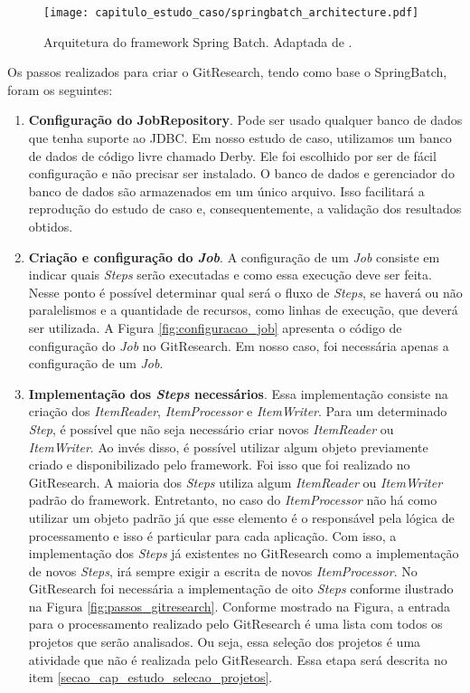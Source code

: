  \begin{figure}[H]
  \centering
  \texttt{[image: capitulo\_estudo\_caso/springbatch\_architecture.pdf]} 
  \caption{Arquitetura do framework Spring Batch. Adaptada de \cite{minella2011pro}.}
  \label{fig:arquitetura_gitresearch} 
\end{figure}

Os passos realizados para criar o GitResearch, tendo como base o SpringBatch, foram os seguintes:


\begin{enumerate}
\item \textbf{Configuração do JobRepository}. Pode ser usado qualquer banco de dados que tenha suporte ao JDBC\cite{reese2000database}. Em nosso estudo de caso, utilizamos um banco de dados de código livre chamado Derby\cite{mei2010research}.  Ele foi escolhido por ser de fácil configuração e não precisar ser instalado. O banco de dados e gerenciador do banco de dados são armazenados em um único arquivo. Isso facilitará a reprodução do estudo de caso e, consequentemente, a validação dos resultados obtidos.
\item \textbf{Criação e configuração do \textit{Job}}. A configuração de um \textit{Job} consiste em indicar quais \textit{Steps} serão executadas e como essa execução deve ser feita. Nesse ponto é possível determinar qual será o fluxo de \textit{Steps}, se haverá ou não paralelismos  e a quantidade de recursos, como linhas de execução, que deverá ser utilizada. A Figura \ref{fig:configuracao_job} apresenta o código de configuração do \textit{Job} no GitResearch. Em nosso caso, foi necessária apenas a configuração de um \textit{Job}.
\item \textbf{Implementação  dos  \textit{Steps} necessários}. Essa implementação consiste na criação dos \textit{ItemReader}, \textit{ItemProcessor} e \textit{ItemWriter}. Para um determinado \textit{Step}, é possível que não seja necessário criar novos \textit{ItemReader} ou \textit{ItemWriter}. Ao invés disso, é possível utilizar algum objeto previamente criado e disponibilizado pelo framework. Foi isso que foi realizado no GitResearch. A maioria dos \textit{Steps} utiliza algum \textit{ItemReader} ou \textit{ItemWriter} padrão do framework. Entretanto, no caso do \textit{ItemProcessor} não há como utilizar um objeto padrão já que esse elemento é o responsável pela lógica de processamento e isso é particular para cada aplicação. Com isso, a implementação dos \textit{Steps} já existentes no GitResearch como a implementação de novos \textit{Steps}, irá sempre exigir a escrita de novos \textit{ItemProcessor}. No GitResearch foi necessária a implementação de oito \textit{Steps} conforme ilustrado na Figura \ref{fig:passos_gitresearch}.  Conforme mostrado na Figura, a entrada para o processamento realizado pelo GitResearch é uma lista com todos os projetos que serão analisados. Ou seja, essa seleção dos projetos é uma atividade que não é realizada pelo GitResearch. Essa etapa será descrita no item \ref{secao_cap_estudo_selecao_projetos}.
\end{enumerate}



